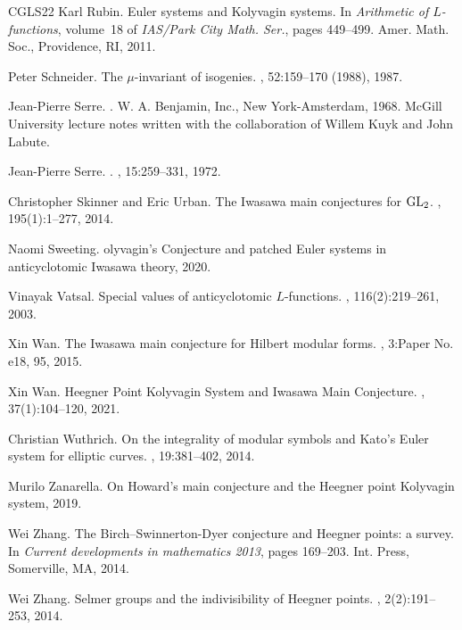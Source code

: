 \documentclass[10pt,reqno]{amsart}
\numberwithin{equation}{section}
\theoremstyle{plain}
\theoremstyle{definition}
\theoremstyle{definition}
\theoremstyle{plain}
\theoremstyle{plain}
\theoremstyle{plain}
\theoremstyle{plain}
\theoremstyle{plain}
\theoremstyle{plain}
\begin{document}
\begin{thebibliography}{CGLS22}
Karl Rubin.
\newblock Euler systems and {K}olyvagin systems.
\newblock In {\em Arithmetic of {$L$}-functions}, volume~18 of {\em IAS/Park
  City Math. Ser.}, pages 449--499. Amer. Math. Soc., Providence, RI, 2011.

Peter Schneider.
\newblock The {$\mu$}-invariant of isogenies.
, 52:159--170 (1988), 1987.

Jean-Pierre Serre.
.
\newblock W. A. Benjamin, Inc., New York-Amsterdam, 1968.
\newblock McGill University lecture notes written with the collaboration of
  Willem Kuyk and John Labute.

Jean-Pierre {Serre}.
.
, 15:259--331, 1972.

Christopher Skinner and Eric Urban.
\newblock The {I}wasawa main conjectures for {$\rm GL_2$}.
, 195(1):1--277, 2014.

Naomi Sweeting.
olyvagin's {C}onjecture and patched {E}uler systems in
  anticyclotomic {I}wasawa theory, 2020.

Vinayak Vatsal.
\newblock Special values of anticyclotomic {$L$}-functions.
, 116(2):219--261, 2003.

Xin Wan.
\newblock The {I}wasawa main conjecture for {H}ilbert modular forms.
, 3:Paper No. e18, 95, 2015.

Xin Wan.
\newblock Heegner {P}oint {K}olyvagin {S}ystem and {I}wasawa {M}ain
  {C}onjecture.
, 37(1):104--120, 2021.

Christian Wuthrich.
\newblock On the integrality of modular symbols and {K}ato's {E}uler system for
  elliptic curves.
, 19:381--402, 2014.

Murilo Zanarella.
\newblock On {H}oward's main conjecture and the {H}eegner point {K}olyvagin
  system, 2019.

Wei Zhang.
\newblock The {B}irch--{S}winnerton-{D}yer conjecture and {H}eegner points: a
  survey.
\newblock In {\em Current developments in mathematics 2013}, pages 169--203.
  Int. Press, Somerville, MA, 2014.

Wei Zhang.
\newblock Selmer groups and the indivisibility of {Heegner} points.
, 2(2):191--253, 2014.

\end{thebibliography}
\end{document}
